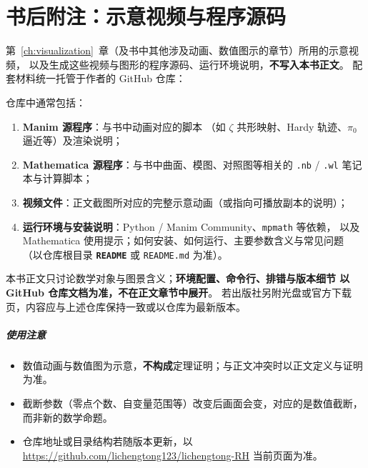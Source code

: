 \chapter*{书后附注：示意视频与程序源码}

第~\ref{ch:visualization}~章（及书中其他涉及动画、数值图示的章节）所用的示意视频，
以及生成这些视频与图形的程序源码、运行环境说明，\textbf{不写入本书正文}。
配套材料统一托管于作者的 GitHub 仓库：

\begin{center}
\end{center}

仓库中通常包括：
\begin{enumerate}
  \item \textbf{Manim 源程序}：与书中动画对应的脚本
        （如 $\zeta$ 共形映射、Hardy 轨迹、$\pi_0$ 逼近等）及渲染说明；
  \item \textbf{Mathematica 源程序}：与书中曲面、模图、对照图等相关的
        \texttt{.nb} / \texttt{.wl} 笔记本与计算脚本；
  \item \textbf{视频文件}：正文截图所对应的完整示意动画（或指向可播放副本的说明）；
  \item \textbf{运行环境与安装说明}：Python / Manim Community、\texttt{mpmath} 等依赖，
        以及 Mathematica 使用提示；如何安装、如何运行、主要参数含义与常见问题
        （以仓库根目录 \textbf{\texttt{README}} 或 \texttt{README.md} 为准）。
\end{enumerate}

本书正文只讨论数学对象与图景含义；\textbf{环境配置、命令行、排错与版本细节
以 GitHub 仓库文档为准，不在正文章节中展开}。
若出版社另附光盘或官方下载页，内容应与上述仓库保持一致或以仓库为最新版本。

\paragraph{使用注意}
\begin{itemize}
  \item 数值动画与数值图为示意，\textbf{不构成}定理证明；与正文冲突时以正文定义与证明为准。
  \item 截断参数（零点个数、自变量范围等）改变后画面会变，对应的是数值截断，而非新的数学命题。
  \item 仓库地址或目录结构若随版本更新，以 \url{https://github.com/lichengtong123/lichengtong-RH} 当前页面为准。
\end{itemize}
